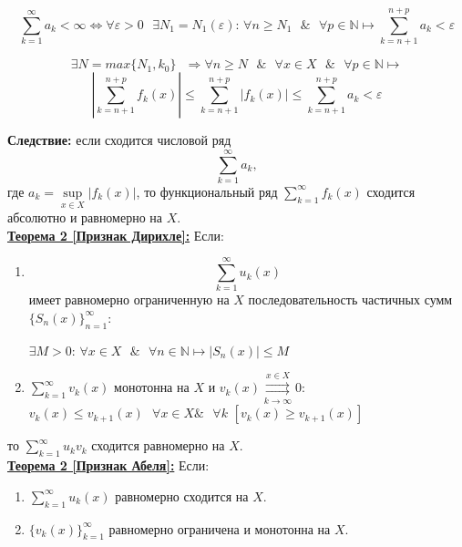 \documentclass[a4paper,12pt]{article} %
\begin{document}
$$\sum\limits_{k = 1}^{\infty}a_k < \infty \Leftrightarrow \forall \varepsilon > 0 \text{ }\exists N_1 = N_1(\varepsilon)\text{: } \forall n \geq N_1 \text{ }\&\text{ } \forall p \in \mathds{N} \longmapsto \sum\limits_{k = n+1}^{n+p}a_k < \varepsilon$$ 

$$\exists N = max\{N_1, k_0\} \text{ } \Rightarrow \forall n \geq N \text{ } \& \text{ } \forall x \in X \text{ } \& \text{ } \forall p \in \mathds{N}\longmapsto$$ $$|\sum\limits_{k = n+1}^{n+p}f_k(x)| \leq \sum\limits_{k = n+1}^{n+p}|f_k(x)| \leq \sum\limits_{k = n+1}^{n+p}a_k < \varepsilon$$

\textbf{Следствие:} если сходится числовой ряд $$\sum\limits_{k = 1}^{\infty}a_k,$$ где $a_k = \sup\limits_{x \in X}|f_k(x)|$, то функциональный ряд $\sum\limits_{k = 1}^{\infty}  f_k(x)$ сходится абсолютно и равномерно на $X$. \\

\underline{\textbf{Теорема 2 [Признак Дирихле]:}} Если:
\begin{enumerate}
    \item $$\sum\limits_{k = 1}^{\infty}  u_k(x)$$ имеет равномерно ограниченную на $X$ последовательность частичных сумм $\{S_n(x)\}_{n=1}^\infty$: 
    \newline
    
    $\exists M > 0 \text{: } \forall x \in X \text{ }\& \text{ } \forall n \in \mathds{N} \longmapsto |S_n(x)| \leq M$
    
    \item $\sum\limits_{k = 1}^{\infty}  v_k(x)$ монотонна на $X$ и $v_k(x) \overset{x \in X}{\underset{k \rightarrow \infty}{\rightrightarrows}} 0$: \newline
    \\[5 mm]
    $v_k(x) \leq v_{k+1}(x) \text{ } \forall x \in X \text{} \& \text{ } \forall k$
    \newline
    $[v_k(x) \geq v_{k+1}(x)]$
    
\end{enumerate}

\hspace*{40 mm}то $\sum\limits_{k=1}^{\infty} u_k v_k$ сходится равномерно на $X$.\\

\underline{\textbf{Теорема 2 [Признак Абеля]:}}
Если:
\begin{enumerate}
    \item  $\sum\limits_{k=1}^\infty u_k(x)$ равномерно сходится на $X$.
    
    \item ${\{v_k(x)\}_{k=1}^\infty}$ равномерно ограничена и монотонна на $X$.
\end{enumerate}
\end{document}
